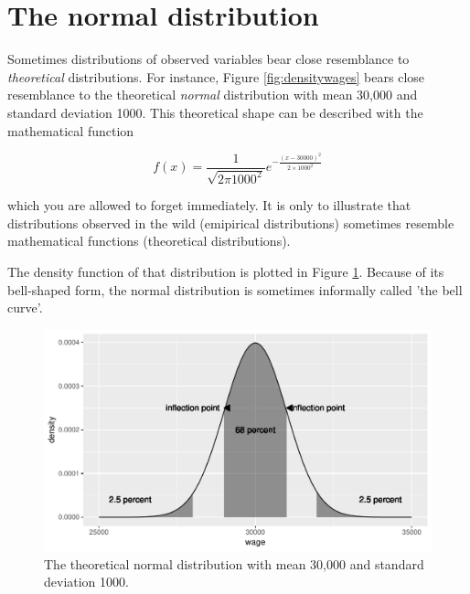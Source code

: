\documentclass[]{report}\usepackage[]{graphicx}\usepackage[]{color}
\makeatletter
\def\maxwidth{ %
  \ifdim\Gin@nat@width>\linewidth
    \linewidth
  \else
    \Gin@nat@width
  \fi
}
\newenvironment{knitrout}{}{} %
\makeatother
\begin{document}
\section{The normal distribution}

Sometimes distributions of observed variables bear close resemblance to \textit{theoretical} distributions. For instance, Figure \ref{fig:densitywages} bears close resemblance to the theoretical \textit{normal} distribution with mean 30,000 and standard deviation 1000. This theoretical shape can be described with the mathematical function

\begin{equation}
f(x)  = \frac{1}{\sqrt{2 \pi 1000^2}} e^{ { -\frac{(x - 30000)^2}{2 \times  1000^2}  } }
\end{equation}

which you are allowed to forget immediately. It is only to illustrate that distributions observed in the wild (emipirical distributions) sometimes resemble  mathematical functions (theoretical distributions).

The density function of that distribution is plotted in Figure \ref{fig:distr_4}. Because of its bell-shaped form, the normal distribution is sometimes informally called 'the bell curve'.




\begin{knitrout}
\color{fgcolor}\begin{figure}

{\centering \includegraphics[width=\maxwidth]{figure/distr_4-1} 

}

\caption[The theoretical normal distribution with mean 30,000 and standard deviation 1000]{The theoretical normal distribution with mean 30,000 and standard deviation 1000.}\label{fig:distr_4}
\end{figure}


\end{knitrout}
\end{document}
